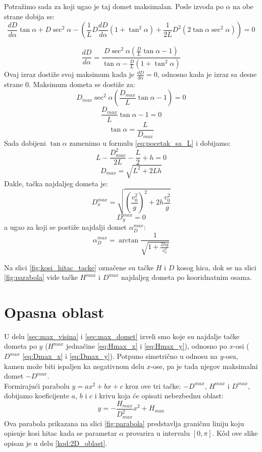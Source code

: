 \documentclass[a4paper]{article}
\begin{document}
Potražimo sada za koji ugao je taj domet maksimalan.
Posle izvoda po $\alpha$ na obe strane dobija se:
$$ \frac{dD}{d\alpha}\tan\alpha 
+ D \sec^2 \alpha - 
\left( \frac1L D \frac{dD}{d\alpha}(1+\tan^2\alpha) + 
\frac{1}{2L} D^2(2\tan\alpha \sec^2\alpha) \right) = 0 $$

$$ \frac{dD}{d\alpha} = 
\frac{D \sec^2\alpha(\frac{D}{L} \tan \alpha - 1)}
{\tan\alpha-\frac{D}{L}(1 + \tan^2 \alpha)} $$
Ovaj izraz dostiže svoj maksimum kada je $\frac{dD}{d\alpha} = 0$, odnosno kada je izraz
sa desne strane 0. Maksimum dometa se dostiže za:
$$ D_{max} \sec^2 \alpha (\frac{D_{max}}{L} \tan \alpha - 1) = 0 $$
$$ \frac{D_{max}}{L}\tan\alpha-1 = 0 $$
$$ \tan \alpha = \frac{L}{D_{max}} $$
Sada dobijeni $\tan \alpha$ zamenimo u formulu \ref{eq:pocetak_sa_L} i dobijamo:
$$ L - \frac{D_{max}^2}{2L} - \frac{L}{2} + h = 0 $$
$$ D_{max} = \sqrt{L^2 + 2Lh} $$
Dakle, tačka najdaljeg dometa je:
\begin{equation}
\label{eq:Dmax_x}
D^{max}_x = \sqrt{\left(\frac{v_0^2}{g}\right)^2 + 2h\frac{v_0^2}{g}}
\end{equation}
\begin{equation}
\label{eq:Dmax_y}
D^{max}_y = 0
\end{equation}
a ugao za koji se postiže najdalji domet $\alpha^{max}_{D}$:
\begin{equation}
\label{eq:Dmax_alpha}
 \alpha^{max}_{D} = \arctan \frac{1}{\sqrt{1 + \frac{2hg}{v_0^2}}}
\end{equation}


Na slici \ref{fig:kosi_hitac_tacke} označene su tačke $H$ i $D$ kosog hica, dok se
na slici \ref{fig:parabola} vide tačke $H^{max}$ i $D^{max}$ najdaljeg dometa po
kooridnatnim osama.



\section{Opasna oblast}
\label{sec:opasna_oblast}
U delu \ref{sec:max_visina} i \ref{sec:max_domet} izveli smo koje su najdalje tačke dometa
po $y$ ($H^{max}$ jednačine \ref{eq:Hmax_x} i \ref{eq:Hmax_y}), 
odnosno po $x$-osi ($D^{max}$ \ref{eq:Dmax_x} i \ref{eq:Dmax_y}). 
Potpuno simetrično u odnosu na $y$-osu, kamen može biti ispaljen ka negativnom delu
$x$-ose, pa je tada njegov maksimalni domet $-D^{max}$.\\

Formirajući parabolu $y = ax^2 + bx + c$ kroz ove tri tačke: 
$-D^{max}$, $H^{max}$ i $D^{max}$, dobijamo koeficijente $a$, $b$ i $c$ 
i krivu koja će opisati nebezbednu oblast:
\begin{equation}
\label{eq:parabola_oblasti}
y=-\frac{H_{max}}{D^2_{max}}x^2 + H_{max}
\end{equation} %
Ova parabola prikazana na slici \ref{fig:parabola} predstavlja 
graničnu liniju koju opisuje kosi hitac kada se parametar $\alpha$
provarira u intervalu $[0,\pi]$. K\^od ove slike opisan je u delu \ref{kod:2D_oblast}.\\
\end{document}
